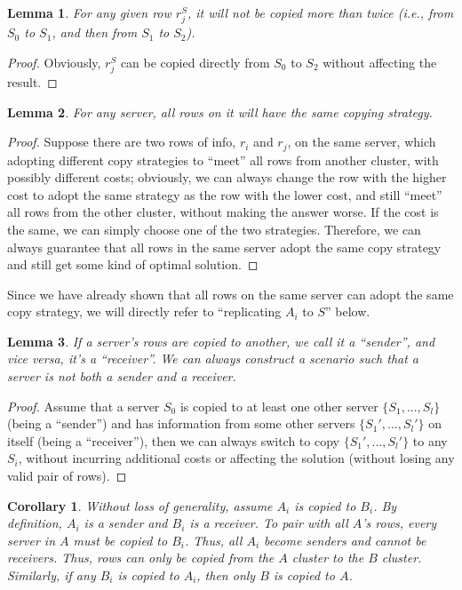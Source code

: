 \documentclass[11pt, a4paper, oneside]{memoir}
\newtheorem{lemma}{Lemma}
\newtheorem{corollary}{Corollary}
\begin{document}
\begin{lemma}
  For any given row $r^S_j$, it will not be copied more than twice
  (i.e., from $S_0$ to $S_1$, and then from $S_1$ to $S_2$).
\end{lemma}
\begin{proof}
  Obviously, $r^S_j$ can be copied directly from $S_0$ to $S_2$ without affecting the result.
\end{proof}

\begin{lemma}
  For any server, all rows on it will have the same copying strategy.
\end{lemma}
\begin{proof}
  Suppose there are two rows of info, $r_i$ and $r_j$, on the same server,
  which adopting different copy strategies to ``meet'' all rows from another cluster,
  with possibly different costs; obviously, we can always change the row with the higher cost
  to adopt the same strategy as the row with the lower cost,
  and still ``meet'' all rows from the other cluster, without making the answer worse.
  If the cost is the same, we can simply choose one of the two strategies.
  Therefore, we can always guarantee that all rows in the same server adopt the same copy strategy
  and still get some kind of optimal solution.
\end{proof}

Since we have already shown that all rows on the same server can adopt the same copy strategy,
we will directly refer to ``replicating $A_i$ to $S$'' below.

\begin{lemma}
  If a server's rows are copied to another, we call it a ``sender'', and vice versa, it's a ``receiver''.
  We can always construct a scenario such that a server is not both a sender and a receiver.
\end{lemma}
\begin{proof}
  Assume that a server $S_0$ is copied to at least one other server $\{S_1, ..., S_l\}$ (being a ``sender'')
  and has information from some other servers $\{S_1', ..., S_l'\}$ on itself (being a ``receiver''),
  then we can always switch to copy $\{S_1', ..., S_l'\}$ to any $S_i$,
  without incurring additional costs or affecting the solution (without losing any valid pair of rows).
\end{proof}

\begin{corollary}
  Without loss of generality, assume $A_i$ is copied to $B_i$. By definition, $A_i$ is a sender and $B_i$ is a receiver.
  To pair with all $A$'s rows, every server in $A$ must be copied to $B_i$.
  Thus, all $A_i$ become senders and cannot be receivers.
  Thus, rows can only be copied from the $A$ cluster to the $B$ cluster.
  Similarly, if any $B_i$ is copied to $A_i$, then only $B$ is copied to $A$.
\end{corollary}
\end{document}
